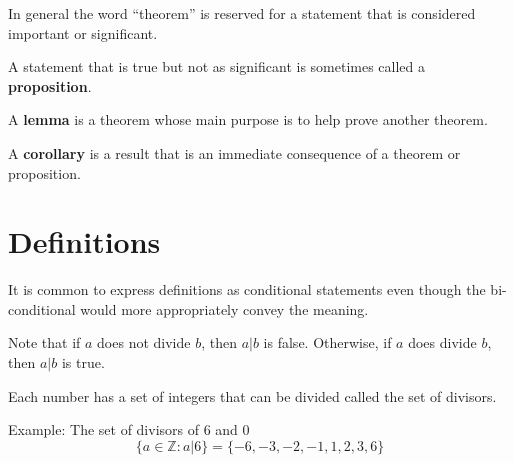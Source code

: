 \documentclass{article}
\begin{document}
In general the word “theorem” is reserved for a statement
that is considered important or significant.

A statement that is true but not as significant is sometimes called
a \textbf{proposition}. 

A \textbf{lemma} is a theorem whose main purpose is to help prove
another theorem. 

A \textbf{corollary} is a result that is an immediate consequence
of a theorem or proposition.

\section{Definitions}




It is common to express definitions as conditional statements even though the bi-conditional would more appropriately convey the meaning.


Note that if $a$ does not divide $b$, then $a|b$ is false. Otherwise, if $a$ does divide $b$, then $a|b$ is true.

Each number has a set of integers that can be divided called the set of divisors.

Example: The set of divisors of 6 and 0
\begin{equation}
    \{a \in \mathbb{Z} : a|6\} = \{-6,-3,-2,-1,1,2,3,6\}
\end{equation}
\end{document}
